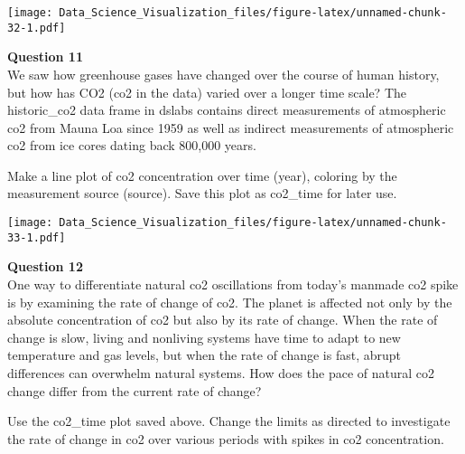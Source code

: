 \documentclass[]{article}
\newenvironment{Shaded}{\begin{snugshade}}{\end{snugshade}}
\newcommand{\DataTypeTok}[1]{\textcolor[rgb]{0.13,0.29,0.53}{#1}}
\newcommand{\KeywordTok}[1]{\textcolor[rgb]{0.13,0.29,0.53}{\textbf{#1}}}
\newcommand{\NormalTok}[1]{#1}
\newcommand{\OperatorTok}[1]{\textcolor[rgb]{0.81,0.36,0.00}{\textbf{#1}}}
\newcommand{\StringTok}[1]{\textcolor[rgb]{0.31,0.60,0.02}{#1}}
\begin{document}
\begin{Shaded}
\end{Shaded}

\texttt{[image: Data\_Science\_Visualization\_files/figure-latex/unnamed-chunk-32-1.pdf]}

\textbf{Question 11}\\
We saw how greenhouse gases have changed over the course of human
history, but how has CO2 (co2 in the data) varied over a longer time
scale? The historic\_co2 data frame in dslabs contains direct
measurements of atmospheric co2 from Mauna Loa since 1959 as well as
indirect measurements of atmospheric co2 from ice cores dating back
800,000 years.

Make a line plot of co2 concentration over time (year), coloring by the
measurement source (source). Save this plot as co2\_time for later use.

\begin{Shaded}
\end{Shaded}

\texttt{[image: Data\_Science\_Visualization\_files/figure-latex/unnamed-chunk-33-1.pdf]}

\textbf{Question 12}\\
One way to differentiate natural co2 oscillations from today's manmade
co2 spike is by examining the rate of change of co2. The planet is
affected not only by the absolute concentration of co2 but also by its
rate of change. When the rate of change is slow, living and nonliving
systems have time to adapt to new temperature and gas levels, but when
the rate of change is fast, abrupt differences can overwhelm natural
systems. How does the pace of natural co2 change differ from the current
rate of change?

Use the co2\_time plot saved above. Change the limits as directed to
investigate the rate of change in co2 over various periods with spikes
in co2 concentration.
\end{document}
